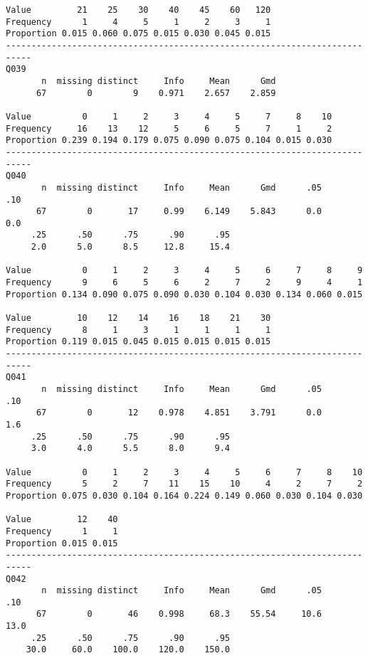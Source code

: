 \documentclass[]{article}
\begin{document}
\begin{verbatim}
Value         21    25    30    40    45    60   120
Frequency      1     4     5     1     2     3     1
Proportion 0.015 0.060 0.075 0.015 0.030 0.045 0.015
---------------------------------------------------------------------------
Q039 
       n  missing distinct     Info     Mean      Gmd 
      67        0        9    0.971    2.657    2.859 
                                                                
Value          0     1     2     3     4     5     7     8    10
Frequency     16    13    12     5     6     5     7     1     2
Proportion 0.239 0.194 0.179 0.075 0.090 0.075 0.104 0.015 0.030
---------------------------------------------------------------------------
Q040 
       n  missing distinct     Info     Mean      Gmd      .05      .10 
      67        0       17     0.99    6.149    5.843      0.0      0.0 
     .25      .50      .75      .90      .95 
     2.0      5.0      8.5     12.8     15.4 
                                                                      
Value          0     1     2     3     4     5     6     7     8     9
Frequency      9     6     5     6     2     7     2     9     4     1
Proportion 0.134 0.090 0.075 0.090 0.030 0.104 0.030 0.134 0.060 0.015
                                                    
Value         10    12    14    16    18    21    30
Frequency      8     1     3     1     1     1     1
Proportion 0.119 0.015 0.045 0.015 0.015 0.015 0.015
---------------------------------------------------------------------------
Q041 
       n  missing distinct     Info     Mean      Gmd      .05      .10 
      67        0       12    0.978    4.851    3.791      0.0      1.6 
     .25      .50      .75      .90      .95 
     3.0      4.0      5.5      8.0      9.4 
                                                                      
Value          0     1     2     3     4     5     6     7     8    10
Frequency      5     2     7    11    15    10     4     2     7     2
Proportion 0.075 0.030 0.104 0.164 0.224 0.149 0.060 0.030 0.104 0.030
                      
Value         12    40
Frequency      1     1
Proportion 0.015 0.015
---------------------------------------------------------------------------
Q042 
       n  missing distinct     Info     Mean      Gmd      .05      .10 
      67        0       46    0.998     68.3    55.54     10.6     13.0 
     .25      .50      .75      .90      .95 
    30.0     60.0    100.0    120.0    150.0 


\end{verbatim}
\end{document}
